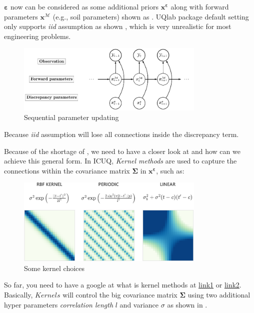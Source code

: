 \documentclass{ol-softwaremanual}
\begin{document}
$\boldsymbol{\varepsilon}$ now can be considered as some additional priors $\boldsymbol{x^{\varepsilon}}$ along with forward parameters $\boldsymbol{x}^{\mathcal{M}}$ (e.g., soil parameters) shown as . UQlab package default setting only supports \textit{iid} assumption as shown , which is very unrealistic for most engineering problems. 
 \begin{figure}[htbp]
    \centering
    \includegraphics[width = 90mm]{figures/figure-Sequential_Bayesian_updating.pdf}
    \caption{Sequential parameter updating}
    \label{fig:figure-Sequential_Bayesian_updating}
\end{figure}
Because \textit{iid} assumption will lose all connections inside the discrepancy term. 


Because of the shortage of , we need to have a closer look at  and how can we achieve this general form. In ICUQ, \textit{Kernel methods} are used to capture the connections within the covariance matrix $\boldsymbol{\Sigma}$ in $\boldsymbol{x^{\varepsilon}}$, such as:
 \begin{figure}[htbp]
    \centering
    \includegraphics[width = 90mm]{figures/figure-kernel.pdf}
    \caption{Some kernel choices}
    \label{fig:figure-kernel}
\end{figure}

So far, you need to have a google at what is kernel methods at \href{https://distill.pub/2019/visual-exploration-gaussian-processes/}{link1} or \href{https://smlbook.org/GP/}{link2}. Basically, $\textit{Kernels}$ will control the big covariance matrix $\boldsymbol{\Sigma}$ using two additional hyper parameters \textit{correlation length} $l$ and variance $\sigma$ as shown in .
\end{document}
